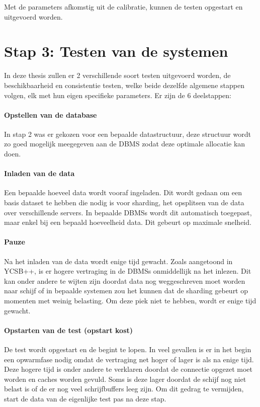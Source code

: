 Met de parameters afkomstig uit de calibratie, kunnen de testen opgestart en uitgevoerd worden. 

\section{Stap 3: Testen van de systemen}
In deze thesis zullen er 2 verschillende soort testen uitgevoerd worden, de beschikbaarheid en consistentie testen, welke beide dezelfde algemene stappen volgen, elk met hun eigen specifieke parameters. Er zijn de 6 deelstappen: 

\paragraph{Opstellen van de database} In stap 2 was er gekozen voor een bepaalde datastructuur, deze structuur wordt zo goed mogelijk meegegeven aan de \gls{DBMS} zodat deze optimale allocatie kan doen.

\paragraph{Inladen van de data} Een bepaalde hoeveel data wordt vooraf ingeladen. Dit wordt gedaan om een basis dataset te hebben die nodig is voor sharding, het opsplitsen van de data over verschillende servers. In bepaalde \glspl{DBMS} wordt dit automatisch toegepast, maar enkel bij een bepaald hoeveelheid data. Dit gebeurt op maximale snelheid. 

\paragraph{Pauze} Na het inladen van de data wordt enige tijd gewacht. Zoals aangetoond in YCSB++\cite[Figuur 9]{patil2011ycsb++}, is er hogere vertraging in de \glspl{DBMS} onmiddellijk na het inlezen. Dit kan onder andere te wijten zijn doordat data nog weggeschreven moet worden naar schijf of in bepaalde systemen zou het kunnen dat de sharding gebeurt op momenten met weinig belasting. Om deze piek niet te hebben, wordt er enige tijd gewacht. 

\paragraph{Opstarten van de test (opstart kost)} De test wordt opgestart en de begint te lopen. In veel gevallen is er in het begin een opwarmfase nodig omdat de vertraging net hoger of lager is als na enige tijd. Deze hogere tijd is onder andere te verklaren doordat de connectie opgezet moet worden en caches worden gevuld. Soms is deze lager doordat de schijf nog niet belast is of de er nog veel schrijfbuffers leeg zijn. Om dit gedrag te vermijden, start de data van de eigenlijke test pas na deze stap. 

